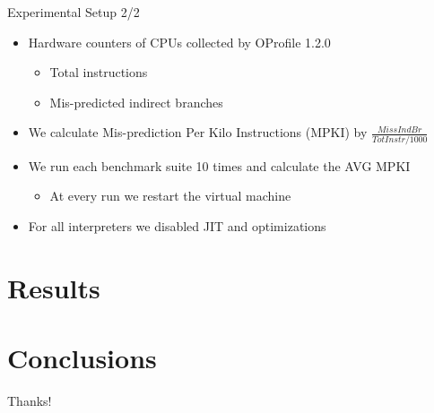 \documentclass[10pt]{beamer}
\begin{document}
\begin{frame}{Experimental Setup 2/2}
	\begin{itemize}
		\item {Hardware counters of CPUs collected by OProfile 1.2.0}
			\begin{itemize}
				\item {Total instructions}
				\item {Mis-predicted indirect branches}
			\end{itemize}
		\item {We calculate Mis-prediction Per Kilo Instructions (MPKI) by} $\frac{MissIndBr}{TotInstr/1000} $%
		\item {We run each benchmark suite 10 times and calculate the AVG MPKI}
		\begin{itemize}
			\item {At every run we restart the virtual machine}
		\end{itemize}
		\item {For all interpreters we disabled JIT and optimizations}
		
	\end{itemize}
\end{frame}
\section{Results}

\section{Conclusions}

\begin{frame}[standout] 
    \huge \textlatin{Thanks!}
\end{frame}
\end{document}
